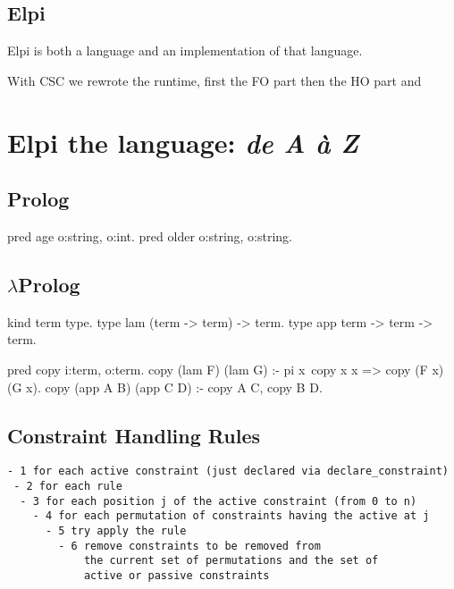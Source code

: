 \documentclass[a4paper, 11pt]{book}
\begin{document}
\section{Elpi}
Elpi is both a language and an implementation of that language.

With CSC we rewrote the runtime, first the FO part then the HO part
and 


\chapter{Elpi the language: \emph{de A \`a Z}}
\cite{ridoux1998lambda}

\section{Prolog}

\begin{elpicode}
pred age o:string, o:int.
pred older o:string, o:string.
\end{elpicode}
    

\section{$\lambda$Prolog}

\begin{elpicode}
kind term type.
type lam (term -> term) -> term.
type app term -> term -> term.

pred copy i:term, o:term.
copy (lam F) (lam G) :- pi x\ copy x x => copy (F x) (G x).
copy (app A B) (app C D) :- copy A C, copy B D.
\end{elpicode}

\section{Constraint Handling Rules}

\cite{chr}
\cite{10.1007/978-3-540-27775-0_7}

\begin{verbatim}
- 1 for each active constraint (just declared via declare_constraint)
 - 2 for each rule
  - 3 for each position j of the active constraint (from 0 to n)
    - 4 for each permutation of constraints having the active at j
      - 5 try apply the rule
        - 6 remove constraints to be removed from
            the current set of permutations and the set of
            active or passive constraints
\end{verbatim}
\end{document}
